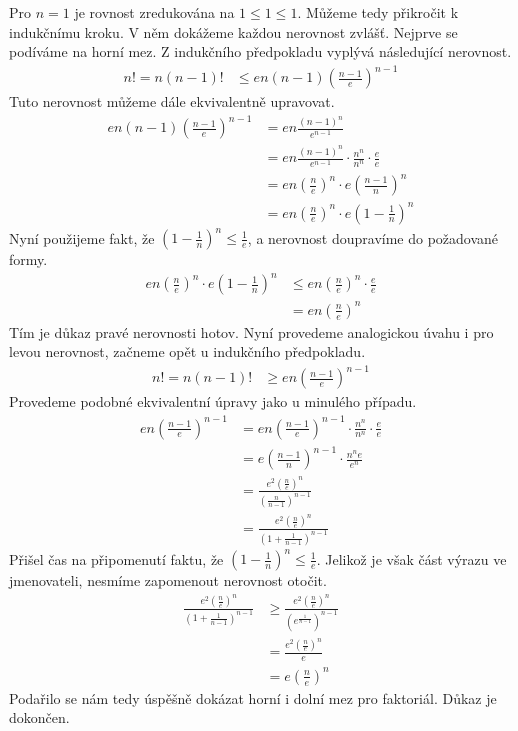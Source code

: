 \begin{t_proof}
  Pro $n=1$ je rovnost zredukována na $1\leq 1\leq 1$. Můžeme tedy přikročit k indukčnímu kroku. V něm dokážeme každou nerovnost zvlášť. Nejprve se podíváme na horní mez. Z indukčního předpokladu vyplývá následující nerovnost.
  \begin{align*}
    n! = n(n-1)! &\leq en(n-1)\left(\frac{n-1}{e}\right)^{n-1}
  \end{align*}
  Tuto nerovnost můžeme dále ekvivalentně upravovat.
  \begin{align*}
    en(n-1)\left(\frac{n-1}{e}\right)^{n-1}
    &= en\frac{(n-1)^n}{e^{n-1}}\\
    &= en\frac{(n-1)^n}{e^{n-1}}\cdot\frac{n^n}{n^n}\cdot\frac{e}{e}\\
    &= en\left(\frac{n}{e}\right)^n\cdot e\left(\frac{n-1}{n}\right)^n\\
    &= en\left(\frac{n}{e}\right)^n\cdot e\left(1-\frac{1}{n}\right)^n
  \end{align*}
  Nyní použijeme fakt, že $\left(1-\frac{1}{n}\right)^n\leq \frac{1}{e}$, a nerovnost doupravíme do požadované formy.
  \begin{align*}
    en\left(\frac{n}{e}\right)^n\cdot e\left(1-\frac{1}{n}\right)^n
    &\leq en\left(\frac{n}{e}\right)^n\cdot \frac{e}{e}\\
    &= en\left(\frac{n}{e}\right)^n
  \end{align*}
  Tím je důkaz pravé nerovnosti hotov. Nyní provedeme analogickou úvahu i pro levou nerovnost, začneme opět u indukčního předpokladu.
  \begin{align*}
    n! = n(n-1)! &\geq en\left(\frac{n-1}{e}\right)^{n-1}
  \end{align*}
  Provedeme podobné ekvivalentní úpravy jako u minulého případu.
  \begin{align*}
    en\left(\frac{n-1}{e}\right)^{n-1}
    &= en\left(\frac{n-1}{e}\right)^{n-1}\cdot\frac{n^n}{n^n}\cdot\frac{e}{e}\\
    &= e\left(\frac{n-1}{n}\right)^{n-1}\cdot\frac{n^ne}{e^{n}}\\
    &= \frac{e^2\left(\frac{n}{e}\right)^n}{\left(\frac{n}{n-1}\right)^{n-1}}\\
    &= \frac{e^2\left(\frac{n}{e}\right)^n}{\left(1+\frac{1}{n-1}\right)^{n-1}}
  \end{align*}
  Přišel čas na připomenutí faktu, že $\left(1-\frac{1}{n}\right)^n\leq \frac{1}{e}$. Jelikož je však část výrazu ve jmenovateli, nesmíme zapomenout nerovnost otočit.
  \begin{align*}
    \frac{e^2\left(\frac{n}{e}\right)^n}{\left(1+\frac{1}{n-1}\right)^{n-1}}
    &\geq \frac{e^2\left(\frac{n}{e}\right)^n}{\left(e^{\frac{1}{n-1}}\right)^{n-1}}\\
    &= \frac{e^2\left(\frac{n}{e}\right)^n}{e}\\
    &= e\left(\frac{n}{e}\right)^n
  \end{align*}
  Podařilo se nám tedy úspěšně dokázat horní i dolní mez pro faktoriál. Důkaz je dokončen.
\end{t_proof}


